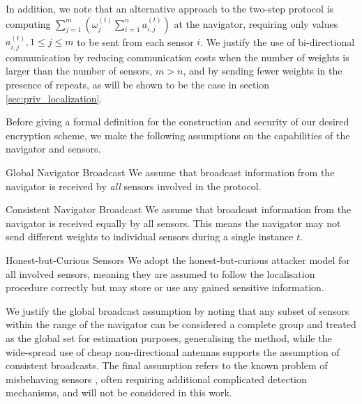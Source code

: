 \documentclass[10pt,letterpaper,oneside,twocolumn,journal]{IEEEtran}
\theoremstyle{definition}
\theoremstyle{definition}
\theoremstyle{remark}
\begin{document}
In addition, we note that an alternative approach to the two-step protocol is computing $\sum^{m}_{j=1}(\omega_j^{(t)}\sum^{n}_{i=1} a_{i,j}^{(t)})$ at the navigator, requiring only values $a_{i,j}^{(t)}, 1 \leq j \leq m$ to be sent from each sensor $i$. We justify the use of bi-directional communication by reducing communication costs when the number of weights is larger than the number of sensors, $m>n$, and by sending fewer weights in the presence of repeats, as will be shown to be the case in section \ref{sec:priv_localization}.

Before giving a formal definition for the construction and security of our desired encryption scheme, we make the following assumptions on the capabilities of the navigator and sensors.
\begin{LaTeXdescription}
    \item[Global Navigator Broadcast] We assume that broadcast information from the navigator is received by \textit{all} sensors involved in the protocol.
    \item[Consistent Navigator Broadcast] We assume that broadcast information from the navigator is received equally by all sensors. This means the navigator may not send different weights to individual sensors during a single instance $t$.
    \item[Honest-but-Curious Sensors] We adopt the honest-but-curious attacker model for all involved sensors, meaning they are assumed to follow the localisation procedure correctly but may store or use any gained sensitive information.
\end{LaTeXdescription}
We justify the global broadcast assumption by noting that any subset of sensors within the range of the navigator can be considered a complete group and treated as the global set for estimation purposes, generalising the method, while the wide-spread use of cheap non-directional antennas supports the assumption of consistent broadcasts. The final assumption refers to the known problem of misbehaving sensors \cite{lazosSeRLocSecureRangeindependent2004,ben-galOutlierDetection2005}, often requiring additional complicated detection mechanisms, and will not be considered in this work.
\end{document}
